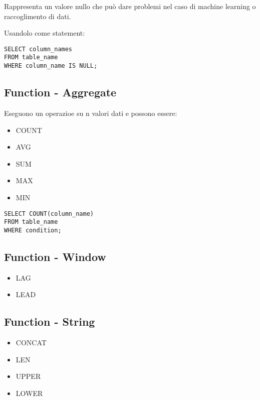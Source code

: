 Rappresenta un valore nullo che può dare problemi nel caso di machine learning o raccoglimento di dati.

Usandolo come statement:

\begin{lstlisting}
SELECT column_names
FROM table_name
WHERE column_name IS NULL;
\end{lstlisting}


\subsection{Function - Aggregate}

Eseguono un operazioe su n valori dati e possono essere:

\begin{itemize}
	\item COUNT
	\item AVG
	\item SUM
	\item MAX
	\item MIN
\end{itemize}

\begin{lstlisting}
SELECT COUNT(column_name)
FROM table_name
WHERE condition;
\end{lstlisting}


\subsection{Function - Window}

\begin{itemize}
	\item LAG
	\item LEAD
\end{itemize}


\subsection{Function - String}

\begin{itemize}
	\item CONCAT
	\item LEN
	\item UPPER
	\item LOWER
\end{itemize}
